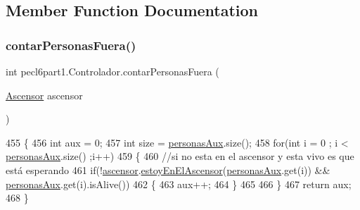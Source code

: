 \subsection{Member Function Documentation}
\mbox{\label{classpecl6part1_1_1_controlador_a75fe6203d44f191bbad90238d1b6a00e}} 
\subsubsection{\texorpdfstring{contar\+Personas\+Fuera()}{contarPersonasFuera()}}
{\footnotesize\ttfamily int pecl6part1.\+Controlador.\+contar\+Personas\+Fuera (\begin{DoxyParamCaption}\item[{\mbox{\hyperlink{classpecl6part1_1_1_ascensor}{Ascensor}}}]{ascensor }\end{DoxyParamCaption})\hspace{0.3cm}{\ttfamily [inline]}}


\begin{DoxyCode}
455     \{
456         \textcolor{keywordtype}{int} aux = 0;
457         \textcolor{keywordtype}{int} size = \mbox{\hyperlink{classpecl6part1_1_1_controlador_a2326908271d514b5346c7091584c0e92}{personasAux}}.size(); 
458         \textcolor{keywordflow}{for}(\textcolor{keywordtype}{int} i = 0 ; i < \mbox{\hyperlink{classpecl6part1_1_1_controlador_a2326908271d514b5346c7091584c0e92}{personasAux}}.size() ;i++)
459         \{
460             \textcolor{comment}{//si no esta en el ascensor y esta vivo es que está esperando}
461             \textcolor{keywordflow}{if}(!\mbox{\hyperlink{classpecl6part1_1_1_controlador_ab1a946290b47216d355b09da476486db}{ascensor}}.\mbox{\hyperlink{classpecl6part1_1_1_ascensor_af9df13b79ebb74d8db4277d32c7c2bf5}{estoyEnElAscensor}}(\mbox{\hyperlink{classpecl6part1_1_1_controlador_a2326908271d514b5346c7091584c0e92}{personasAux}}.get(i)) && 
      \mbox{\hyperlink{classpecl6part1_1_1_controlador_a2326908271d514b5346c7091584c0e92}{personasAux}}.get(i).isAlive())
462             \{
463                 aux++;
464             \}
465             
466         \}
467         \textcolor{keywordflow}{return} aux;
468     \}
\end{DoxyCode}
\mbox{\label{classpecl6part1_1_1_controlador_aa62f73857e81fc76b5621497d0e10149}} 
